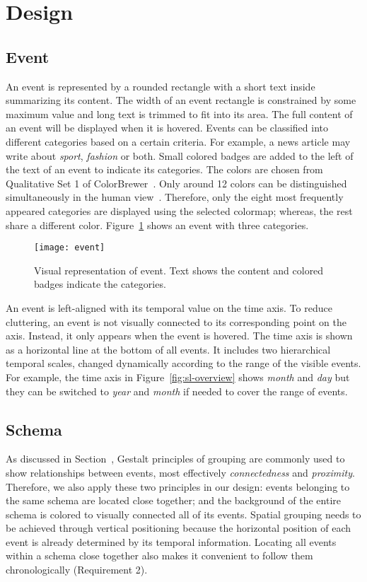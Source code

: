 \section{Design}

\subsection{Event}
An event is represented by a rounded rectangle with a short text inside summarizing its content. The width of an event rectangle is constrained by some maximum value and long text is trimmed to fit into its area. The full content of an event will be displayed when it is hovered. Events can be classified into different categories based on a certain criteria. For example, a news article may write about \emph{sport}, \emph{fashion} or both. Small colored badges are added to the left of the text of an event to indicate its categories. The colors are chosen from Qualitative Set 1 of  ColorBrewer~\cite{Harrower2003}. Only around 12 colors can be distinguished simultaneously in the human view~\cite{Munzner2014}. Therefore, only the eight most frequently appeared categories are displayed using the selected colormap; whereas, the rest share a different color. Figure~\ref{fig:event} shows an event with three categories.

\begin{figure}[!htb]
\centering
\texttt{[image: event]}
\caption{Visual representation of event. Text shows the content and colored badges indicate the categories.}
\label{fig:event}
\end{figure}

An event is left-aligned with its temporal value on the time axis. To reduce cluttering, an event is not visually connected to its corresponding point on the axis. Instead, it only appears when the event is hovered. The time axis is shown as a horizontal line at the bottom of all events. It includes two hierarchical temporal scales, changed dynamically according to the range of the visible events. For example, the time axis in Figure~\ref{fig:sl-overview} shows \emph{month} and \emph{day} but they can be switched to \emph{year} and \emph{month} if needed to cover the range of events.

\subsection{Schema}
As discussed in Section~, Gestalt principles of grouping are commonly used to show relationships between events, most effectively \emph{connectedness} and \emph{proximity}. Therefore, we also apply these two principles in our design: events belonging to the same schema are located close together; and the background of the entire schema is colored to visually connected all of its events. Spatial grouping needs to be achieved through vertical positioning because the horizontal position of each event is already determined by its temporal information. Locating all events within a schema close together also makes it convenient to follow them chronologically (Requirement 2).

